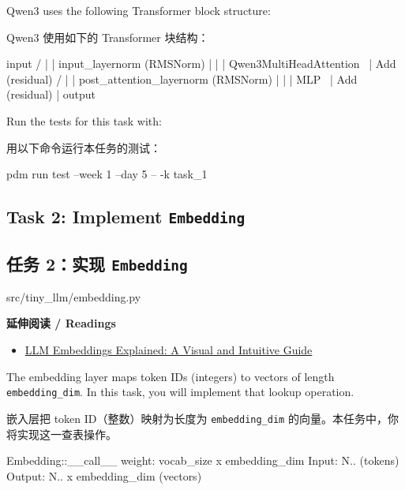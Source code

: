 \documentclass[11pt,a4paper]{article}
\newenvironment{zhpar}{%
  \par\smallskip\begingroup\color{zhcolor}\small\ignorespaces%
}{\endgroup\par\smallskip}
\begin{document}
Qwen3 uses the following Transformer block structure:

\begin{zhpar}
Qwen3 使用如下的 Transformer 块结构：
\end{zhpar}
\begin{codeblock}
  input
/ |
| input_layernorm (RMSNorm)
| |
| Qwen3MultiHeadAttention
\ |
  Add (residual)
/ |
| post_attention_layernorm (RMSNorm)
| |
| MLP
\ |
  Add (residual)
  |
output
\end{codeblock}

Run the tests for this task with:

\begin{zhpar}
用以下命令运行本任务的测试：
\end{zhpar}
\begin{codeblock}
pdm run test --week 1 --day 5 -- -k task_1
\end{codeblock}

\subsection*{Task 2: Implement \texttt{Embedding}}

\subsection*{任务 2：实现 \texttt{Embedding}}

\begin{codeblock}
src/tiny_llm/embedding.py
\end{codeblock}

\textbf{ 延伸阅读 / Readings}

\begin{itemize}[leftmargin=1.6em,itemsep=0.15em,parsep=0pt]
\item \href{https://huggingface.co/spaces/hesamation/primer-llm-embedding}{LLM Embeddings Explained: A Visual and Intuitive Guide}
\end{itemize}

The embedding layer maps token IDs (integers) to vectors of length \texttt{embedding\_dim}. In this task, you will implement that lookup operation.

\begin{zhpar}
嵌入层把 token ID（整数）映射为长度为 \texttt{embedding\_dim} 的向量。本任务中，你将实现这一查表操作。
\end{zhpar}
\begin{codeblock}
Embedding::__call__
weight: vocab_size x embedding_dim
Input: N.. (tokens)
Output: N.. x embedding_dim (vectors)
\end{codeblock}
\end{document}
